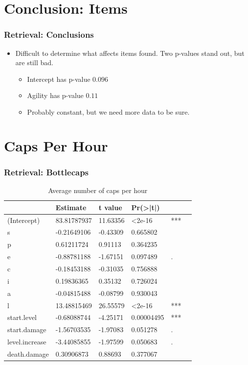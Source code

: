 \documentclass{beamer}
\begin{document}
\section{Conclusion: Items}
\begin{frame}
  \frametitle{Retrieval: Conclusions}
  \begin{itemize}
  \item Difficult to determine what affects items found. Two p-values stand out, but are still bad.
    \begin{itemize}
    \item Intercept has p-value $0.096$
    \item Agility has p-value $0.11$
    \item<2-> Probably constant, but we need more data to be sure.
    \end{itemize}
  \end{itemize}
\end{frame}

\section{Caps Per Hour}
\begin{frame}
  \frametitle{Retrieval: Bottlecaps}
  \begin{table}
\caption{Average number of caps per hour}
\label{table:caps}
\begin{tabular}{l|lllll}
&Estimate&t value&Pr(>|t|)&\\  
\hline  
(Intercept)&83.81787937  &  11.63356 &<2e-16& ***\\
s &-0.21649106   & -0.43309 &    0.665802 &   \\
p&  0.61211724    & 0.91113 &   0.364235 &   \\
e & -0.88781188    &-1.67151 &   0.097489 &  . \\
c&-0.18453188  &  -0.31035  &  0.756888 &   \\
i& 0.19836365    & 0.35132  &  0.726024 &   \\
a  & -0.04815488  & -0.08799 &   0.930043&    \\
l &   13.48815469   & 26.55579&  <2e-16& ***\\
start.level &  -0.68088744   &  -4.25171 &   0.00004495 & *** \\ 
start.damage& -1.56703535   & -1.97083 &   0.051278 & . \\ 
level.increase & -3.44085855  & -1.97599 &   0.050683 &.  \\ 
death.damage & 0.30906873   &  0.88693  &  0.377067&\\
\hline
\end{tabular}
\end{table}
\end{frame}
\end{document}
